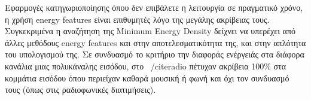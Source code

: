 
Εφαρμογές κατηγωριοποίησης όπου δεν επιβάλετε η λειτουργία σε
πραγματικό χρόνο, η χρήση energy features είναι επιθυμητές λόγο της
μεγάλης ακρίβειας τους. Συγκεκριμένα η αναζήτηση της Minimum Energy
Density δείχνει να υπερέχει από άλλες μεθόδους energy features και
στην αποτελεσματικότητα της, και στην απλότητα του υπολογισμού της. Σε
συνδυασμό το κριτήριο την διαφοράς ενέργειάς στα διάφορα κανάλια μιας
πολυκάναλης εισόδου, στο ~/cite{radio} πέτυχαν ακρίβεια 100\% στα
κομμάτια εισόδου όπου περιείχαν καθαρά μουσική ή φωνή και όχι τον
συνδυασμό τους (όπως στις ραδιοφωνικές διατιμήσεις).

